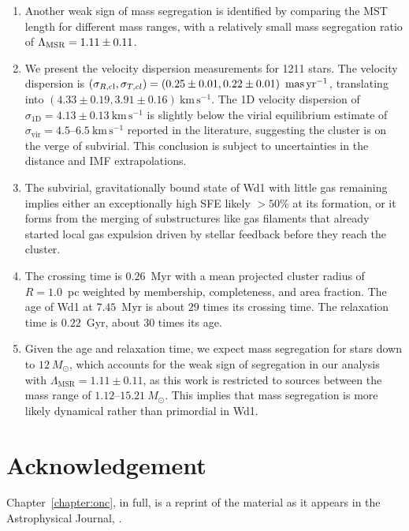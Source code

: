 \documentclass[12pt]{ucsddissertation}
\begin{document}
\begin{CJK*}{UTF8}{gbsn}
\begin{enumerate}[label=\roman*.]
    \item Another weak sign of mass segregation is identified by comparing the MST length for different mass ranges, with a relatively small mass segregation ratio of $\rm \Lambda_{\rm MSR} = 1.11\pm0.11$.
    \item We present the velocity dispersion measurements for \num{1211} stars. The velocity dispersion is $(\sigma_{R, \mathrm{cl}},\sigma_{T, cl})=\left(0.25 \pm 0.01, 0.22 \pm 0.01\right)~\rm mas\,yr^{-1}$, translating into $(4.33 \pm 0.19, 3.91 \pm 0.16)~\mathrm{km}\,\mathrm{s}^{-1}$. The 1D velocity dispersion of $\sigma_\mathrm{1D} = 4.13 \pm 0.13~\mathrm{km}\,\mathrm{s}^{-1}$ is slightly below the virial equilibrium estimate of $\sigma_\mathrm{vir}=4.5$--$6.5~\mathrm{km}\,\mathrm{s}^{-1}$ reported in the literature, suggesting the cluster is on the verge of subvirial. This conclusion is subject to uncertainties in the distance and IMF extrapolations.
    \item The subvirial, gravitationally bound state of Wd1 with little gas remaining implies either an exceptionally high SFE likely $>50\%$ at its formation, or it forms from the merging of substructures like gas filaments that already started local gas expulsion driven by stellar feedback before they reach the cluster.
    \item The crossing time is $0.26$~Myr with a mean projected cluster radius of $R=1.0$~pc weighted by membership, completeness, and area fraction. The age of Wd1 at $7.45$~Myr is about $29$ times its crossing time. The relaxation time is $0.22$~Gyr, about $30$ times its age.
    \item Given the age and relaxation time, we expect mass segregation for stars down to $12~M_\odot$, which accounts for the weak sign of segregation in our analysis with $\Lambda_\mathrm{MSR}=1.11\pm0.11$, as this work is restricted to sources between the mass range of $1.12$--$15.21~M_\odot$. This implies that mass segregation is more likely dynamical rather than primordial in Wd1.
\end{enumerate}


\section*{Acknowledgement}
Chapter~\ref{chapter:onc}, in full, is a reprint of the material as it appears in the Astrophysical Journal, \citealt{Wei-2024}.



\end{CJK*}
\end{document}
